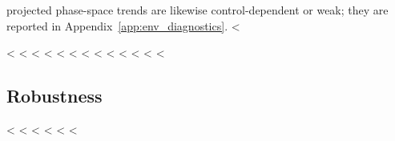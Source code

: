 \documentclass{aa}
\begin{document}
projected phase-space trends are likewise control-dependent or weak; they are reported in Appendix~\ref{app:env_diagnostics}.
<%

<%
<%
<%
<%
<%
<%
<%
<%
<%
<%
<%
<%
<%
\subsection{Robustness}\label{sec:robustness}
<%
<%
<%
<%
<%
<%
\end{document}
